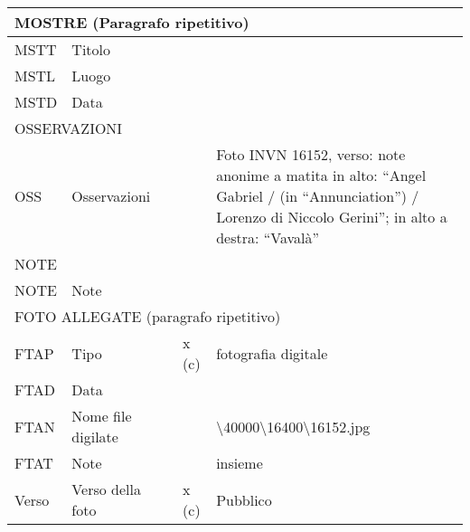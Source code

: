 \begin{center}
\begin{longtable}{ | p{1cm} | p{4cm} | p{.6cm} | p{.6cm} | p{5cm} | }
  \multicolumn{5}{|l|}{\cellcolor{lightcyan}MOSTRE (Paragrafo ripetitivo)} \\ \hline
  MSTT & Titolo &  &  &   \\ \hline
  MSTL & Luogo &  &  &   \\ \hline
  MSTD & Data &  &  &   \\ \hline
  \multicolumn{5}{|l|}{\cellcolor{lightcyan}OSSERVAZIONI} \\ \hline
  OSS & Osservazioni &  &  & Foto INVN 16152, verso: note anonime a matita in alto: ``Angel Gabriel / (in ``Annunciation'') / Lorenzo di Niccolo Gerini''; in alto a destra: ``Vavalà''  \\ \hline
  NOTE &  &  &  &   \\ \hline
  NOTE & Note &  &  &   \\ \hline
  \multicolumn{5}{|l|}{\cellcolor{lightcyan}FOTO ALLEGATE (paragrafo ripetitivo)} \\ \hline
  FTAP & Tipo &  & x (c) & fotografia digitale  \\ \hline
  FTAD & Data &  &  &   \\ \hline
  FTAN & Nome file digilate &  &  & \textbackslash40000\textbackslash16400\textbackslash16152.jpg  \\ \hline
  FTAT & Note &  &  & insieme  \\ \hline
  Verso & Verso della foto &  & x (c) & Pubblico  \\ \hline
\end{longtable}

  


\end{center}
